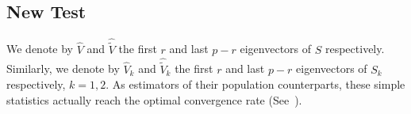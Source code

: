 \documentclass[review]{elsarticle}
\theoremstyle{plain}
\theoremstyle{definition}
\newtheorem{remark}{\quad\quad Remark}
\theoremstyle{remark}
\begin{document}



\subsection{New Test}
We denote by $\hat{V}$ and $\hat{\tilde{V}}$ the first $r$ and last $p-r$ eigenvectors of $S$ respectively.
Similarly, we denote by  $\hat{V}_k$ and $\hat{\tilde{V}}_k$ the first $r$ and last $p-r$ eigenvectors of $S_k$ respectively, $k=1,2$.
 As estimators of their population counterparts, these simple statistics actually reach the optimal convergence rate (See~\cite{Cai2012Sparse}).
\end{document}
